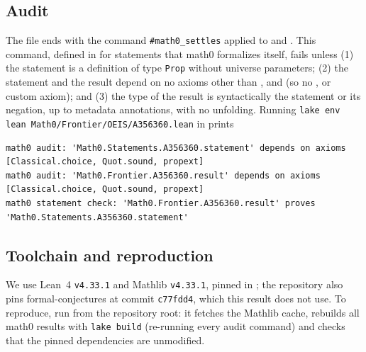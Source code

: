\documentclass[11pt]{amsart}
\theoremstyle{plain}
\theoremstyle{definition}
\begin{document}
\subsection*{Audit}
The file ends with the command \texttt{\#math0\_settles} applied to  and . This command, defined in  for statements that math0 formalizes itself, fails unless (1) the statement is a definition of type \texttt{Prop} without universe parameters; (2) the statement and the result depend on no axioms other than ,  and  (so no ,  or custom axiom); and (3) the type of the result is syntactically the statement or its negation, up to metadata annotations, with no unfolding. Running \texttt{lake env lean Math0/Frontier/OEIS/A356360.lean} in  prints
\begin{lstlisting}[basicstyle=\ttfamily\scriptsize]
math0 audit: 'Math0.Statements.A356360.statement' depends on axioms [Classical.choice, Quot.sound, propext]
math0 audit: 'Math0.Frontier.A356360.result' depends on axioms [Classical.choice, Quot.sound, propext]
math0 statement check: 'Math0.Frontier.A356360.result' proves 'Math0.Statements.A356360.statement'
\end{lstlisting}

\subsection*{Toolchain and reproduction}
We use Lean~4 \cite{Lean4} \texttt{v4.33.1} and Mathlib \cite{Mathlib} \texttt{v4.33.1}, pinned in ; the repository also pins formal-conjectures \cite{FC} at commit \texttt{c77fdd4}, which this result does not use.
To reproduce, run  from the repository root: it fetches the Mathlib cache, rebuilds all math0 results with \texttt{lake build} (re-running every audit command) and checks that the pinned dependencies are unmodified.
\end{document}
